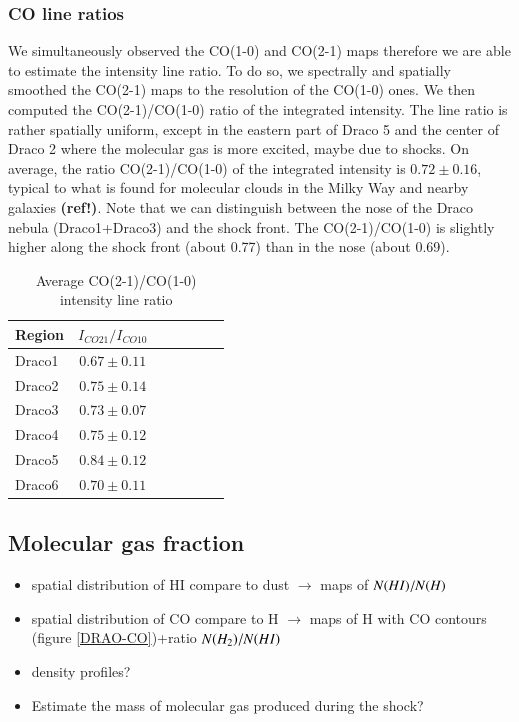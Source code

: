 \documentclass[traditabstract]{aa}
\begin{document}
      \subsubsection{CO line ratios}

   We simultaneously observed the CO(1-0) and CO(2-1) maps therefore we are able to estimate the intensity line ratio. To do so, we spectrally and spatially smoothed the CO(2-1) maps to the resolution of the CO(1-0) ones. We then computed the CO(2-1)/CO(1-0) ratio of the integrated intensity. The line ratio is rather spatially uniform, except in the eastern part of Draco 5 and the center of Draco 2 where the molecular gas is more excited, maybe due to shocks.
On average, the ratio CO(2-1)/CO(1-0) of the integrated intensity is $0.72\pm 0.16$, typical to what is found for molecular clouds in the Milky Way and nearby galaxies \textbf{(ref!)}.
Note that we can distinguish between the nose of the Draco nebula (Draco1+Draco3) and the shock front. The CO(2-1)/CO(1-0) is slightly higher along the shock front (about 0.77) than in the nose (about 0.69).

\begin{table}[h]
  \centering
  \footnotesize
  \caption{Average CO(2-1)/CO(1-0) intensity line ratio}
  \begin{tabular}{lcccccc}
    \hline \hline
    Region & $I_{CO21}/I_{CO10}$ \\ \hline
    Draco1 &   $0.67\pm 0.11$    \\
    Draco2 &   $0.75\pm 0.14$    \\
    Draco3 &   $0.73\pm 0.07$    \\
    Draco4 &   $0.75\pm 0.12$    \\
    Draco5 &   $0.84\pm 0.12$    \\
    Draco6 &   $0.70\pm 0.11$    \\ \hline
  \end{tabular}
\end{table}


   \subsection{Molecular gas fraction}

\begin{itemize}
  \item spatial distribution of HI compare to dust $\rightarrow$ maps of $N(H\rmnum{1})/N(H)$
  \item spatial distribution of CO compare to H $\rightarrow$ maps of H with CO contours (figure \ref{DRAO-CO})+ratio $N(H_2)/N(H\rmnum{1})$
  \item density profiles?
  \item Estimate the mass of molecular gas produced during the shock?
\end{itemize}
\end{document}
